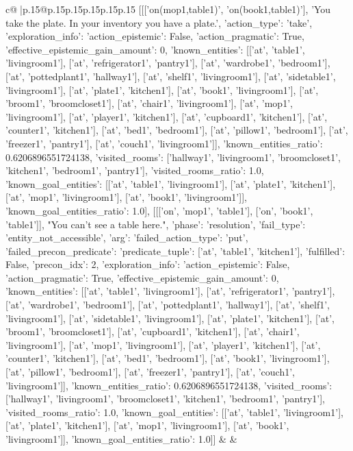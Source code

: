 \documentclass{article}
\begin{document}
{\begin{supertabular}{c@{$\;$}|p{.15\linewidth}@{}p{.15\linewidth}p{.15\linewidth}p{.15\linewidth}p{.15\linewidth}p{.15\linewidth}}
{{{	 [[['on(mop1,table1)', 'on(book1,table1)'], 'You take the plate. In your inventory you have a plate.', {'action_type': 'take', 'exploration_info': {'action_epistemic': False, 'action_pragmatic': True, 'effective_epistemic_gain_amount': 0, 'known_entities': [['at', 'table1', 'livingroom1'], ['at', 'refrigerator1', 'pantry1'], ['at', 'wardrobe1', 'bedroom1'], ['at', 'pottedplant1', 'hallway1'], ['at', 'shelf1', 'livingroom1'], ['at', 'sidetable1', 'livingroom1'], ['at', 'plate1', 'kitchen1'], ['at', 'book1', 'livingroom1'], ['at', 'broom1', 'broomcloset1'], ['at', 'chair1', 'livingroom1'], ['at', 'mop1', 'livingroom1'], ['at', 'player1', 'kitchen1'], ['at', 'cupboard1', 'kitchen1'], ['at', 'counter1', 'kitchen1'], ['at', 'bed1', 'bedroom1'], ['at', 'pillow1', 'bedroom1'], ['at', 'freezer1', 'pantry1'], ['at', 'couch1', 'livingroom1']], 'known_entities_ratio': 0.6206896551724138, 'visited_rooms': ['hallway1', 'livingroom1', 'broomcloset1', 'kitchen1', 'bedroom1', 'pantry1'], 'visited_rooms_ratio': 1.0, 'known_goal_entities': [['at', 'table1', 'livingroom1'], ['at', 'plate1', 'kitchen1'], ['at', 'mop1', 'livingroom1'], ['at', 'book1', 'livingroom1']], 'known_goal_entities_ratio': 1.0}}], [[['on', 'mop1', 'table1'], ['on', 'book1', 'table1']], "You can't see a table here.", {'phase': 'resolution', 'fail_type': 'entity_not_accessible', 'arg': {'failed_action_type': 'put', 'failed_precon_predicate': {'predicate_tuple': ['at', 'table1', 'kitchen1'], 'fulfilled': False, 'precon_idx': 2}}, 'exploration_info': {'action_epistemic': False, 'action_pragmatic': True, 'effective_epistemic_gain_amount': 0, 'known_entities': [['at', 'table1', 'livingroom1'], ['at', 'refrigerator1', 'pantry1'], ['at', 'wardrobe1', 'bedroom1'], ['at', 'pottedplant1', 'hallway1'], ['at', 'shelf1', 'livingroom1'], ['at', 'sidetable1', 'livingroom1'], ['at', 'plate1', 'kitchen1'], ['at', 'broom1', 'broomcloset1'], ['at', 'cupboard1', 'kitchen1'], ['at', 'chair1', 'livingroom1'], ['at', 'mop1', 'livingroom1'], ['at', 'player1', 'kitchen1'], ['at', 'counter1', 'kitchen1'], ['at', 'bed1', 'bedroom1'], ['at', 'book1', 'livingroom1'], ['at', 'pillow1', 'bedroom1'], ['at', 'freezer1', 'pantry1'], ['at', 'couch1', 'livingroom1']], 'known_entities_ratio': 0.6206896551724138, 'visited_rooms': ['hallway1', 'livingroom1', 'broomcloset1', 'kitchen1', 'bedroom1', 'pantry1'], 'visited_rooms_ratio': 1.0, 'known_goal_entities': [['at', 'table1', 'livingroom1'], ['at', 'plate1', 'kitchen1'], ['at', 'mop1', 'livingroom1'], ['at', 'book1', 'livingroom1']], 'known_goal_entities_ratio': 1.0}}]] 
	  } 
	   } 
	   } 
	 & & \\ 
 


\end{supertabular}}
\end{document}
